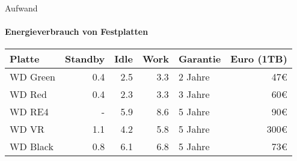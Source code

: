 \begin{frame}{Aufwand}
\framesubtitle{Energieverbrauch von Festplatten}
\begin{tabular}{|l|r|r|r|l|r|}
\hline
\textbf{Platte}   & \textbf{Standby} & \textbf{Idle} & \textbf{Work} & \textbf{Garantie} & \textbf{Euro (1TB)} \\
\hline
WD Green &     0.4 &  2.5 &  3.3 & 2 Jahre  &        47€ \\
\hline
WD Red   &     0.4 &  2.3 &  3.3 & 3 Jahre  &        60€ \\
\hline
WD RE4   &       - &  5.9 &  8.6 & 5 Jahre  &        90€ \\
\hline
WD VR    &     1.1 &  4.2 &  5.8 & 5 Jahre  &       300€ \\
\hline
WD Black &     0.8 &  6.1 &  6.8 & 5 Jahre  &        73€ \\
\hline
\end{tabular}
\end{frame}
